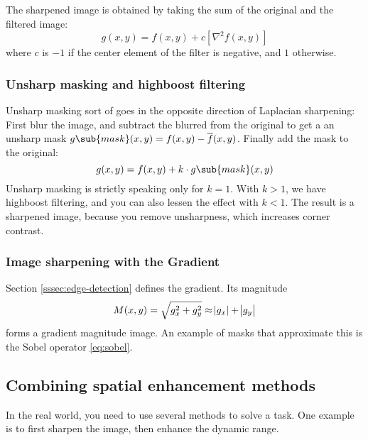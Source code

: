 The sharpened image is obtained by taking the sum of the original and the filtered image:
\begin{equation}
    g(x,y) = f(x,y) + c [\nabla^2 f(x,y)]
\end{equation}
where $c$ is $-1$ if the center element of the filter is negative, and $1$ otherwise.

\subsubsection{Unsharp masking and highboost filtering}\label{sssec:unsharp-highboost-spatial}
Unsharp masking sort of goes in the opposite direction of Laplacian sharpening: First blur the image, and subtract the blurred from the original to get a an unsharp mask $g\sub{mask}(x,y) = f(x,y) - \overline{f}(x,y)$. Finally add the mask to the original:
\begin{equation}\label{eq:unsharp-masking}
    g(x,y) = f(x,y) + k \cdot g\sub{mask}(x,y)
\end{equation}
Unsharp masking is strictly speaking only for $k = 1$. With $k > 1$, we have highboost filtering, and you can also lessen the effect with $k < 1$. The result is a sharpened image, because you remove unsharpness, which increases corner contrast.

\subsubsection{Image sharpening with the Gradient}
Section \ref{sssec:edge-detection} defines the gradient. Its magnitude
\begin{equation}
    M(x,y) = \sqrt{g_x^2 + g_y^2} \approx \abs{g_x} + \abs{g_y}
\end{equation}
forms a gradient magnitude image. An example of masks that approximate this is the Sobel operator \eqref{eq:sobel}.

\subsection[Combining methods]{Combining spatial enhancement methods}
In the real world, you need to use several methods to solve a task. One example is to first sharpen the image, then enhance the dynamic range.
